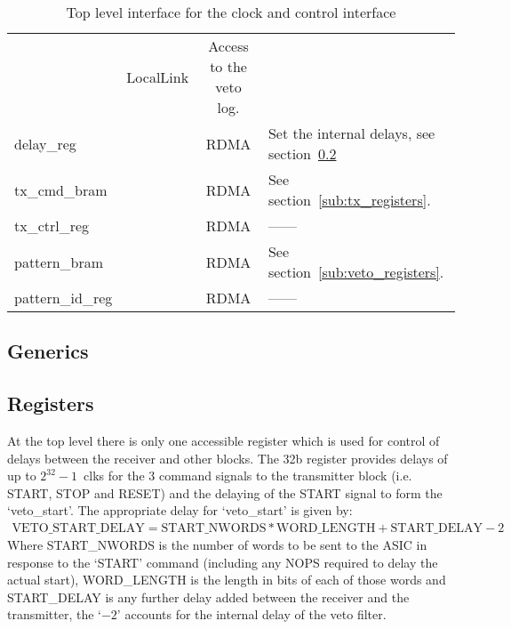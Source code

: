 \documentclass[]{article}
\newcommand*{\dittostraight}{---\textquotedbl---} %
\begin{document}
\begin{table}
\begin{center}
\begin{tabulary}{\textwidth}{l | c | c | L}
                                   & LocalLink & Access to the veto log.                                         \\
                delay\_reg       & & RDMA      & Set the internal delays, see section~\ref{sub:top_registers}    \\
                tx\_cmd\_bram    & & RDMA      & See section~\ref{sub:tx_registers}.                             \\
                tx\_ctrl\_reg    & & RDMA      & \dittostraight                                                  \\
                pattern\_bram    & & RDMA      & See section~\ref{sub:veto_registers}.                           \\
                pattern\_id\_reg & & RDMA      & \dittostraight                                                  \\
            \end{tabulary}
        \end{center}
        \caption{Top level interface for the clock and control interface}
        \label{tab:top_ccc_interface}
    \end{table}
    \subsection{Generics} %
    \label{sub:top_generics}
    \subsection{Registers} %
    \label{sub:top_registers}
    At the top level there is only one accessible register which is used for control of delays between the receiver and other blocks. The 32b register provides delays of up to \( 2^{32} - 1 \)~clks for the 3 command signals to the transmitter block (i.e. START, STOP and RESET) and the delaying of the START signal to form the `veto\_start'. The appropriate delay for `veto\_start' is given by:
    \begin{align}\label{equ:veto_start_delay}
        \text{VETO\_START\_DELAY} = \text{START\_NWORDS} * \text{WORD\_LENGTH} + \text{START\_DELAY} - 2 
    \end{align}
    Where START\_NWORDS is the number of words to be sent to the ASIC in response to the `START' command (including any NOPS required to delay the actual start), WORD\_LENGTH is the length in bits of each of those words and START\_DELAY is any further delay added between the receiver and the transmitter, the `\(- 2\)' accounts for the internal delay of the veto filter. %
    
\end{document}
